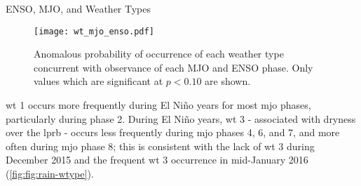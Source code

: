 \begin{block}{ENSO, MJO, and Weather Types}
    \begin{framed}
        \begin{figure}
            \centering
            \caption{
                Anomalous probability of occurrence of each weather type concurrent with observance of each MJO and ENSO phase.
                Only values which are significant at $p < 0.10$ are shown.
            }\label{fig:wt-mjo-ensoflooded}
            \texttt{[image: wt\_mjo\_enso.pdf]}
        \end{figure}
    \end{framed}
    \gls{wt} 1 occurs more frequently during El Ni\~{n}o years for most \gls{mjo} phases, particularly during phase 2.
    During El Ni\~no years, \gls{wt} 3 - associated with dryness over the \gls{lprb} - occurs less frequently during \gls{mjo} phases 4, 6, and 7, and more often during \gls{mjo} phase 8; this is consistent with the lack of \gls{wt} 3 during December 2015 and the frequent \gls{wt} 3 occurrence in mid-January 2016 (\cref{fig:fig:rain-wtype}).
\end{block}
